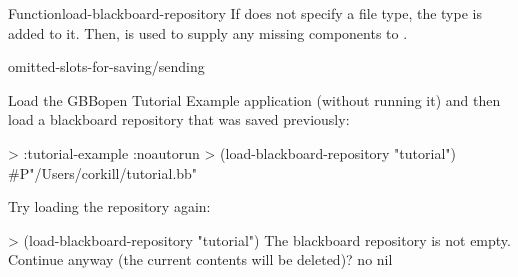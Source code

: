 \documentclass[10pt,twoside,english,pdftex]{article}
\begin{document}
\begin{functiondoc}{Function}{load-blackboard-repository}
\fndescription If  does not specify a file type, the type
 is added to it.  Then,  is used to
supply any missing components to .

\begin{alsos}{omitted-slots-for-saving/sending}
\end{alsos}

\fnexamples Load the GBBopen Tutorial Example application (without running it)
and then load a blackboard repository that was saved previously:
\begin{example}
  > :tutorial-example :noautorun 
  > (load-blackboard-repository "tutorial")
  #P"/Users/corkill/tutorial.bb"
\end{example}
Try loading the repository again:
\begin{example}
  > (load-blackboard-repository "tutorial")
  The blackboard repository is not empty.
  Continue anyway (the current contents will be deleted)? no
  nil
\end{example}

\end{functiondoc}

\end{document}
